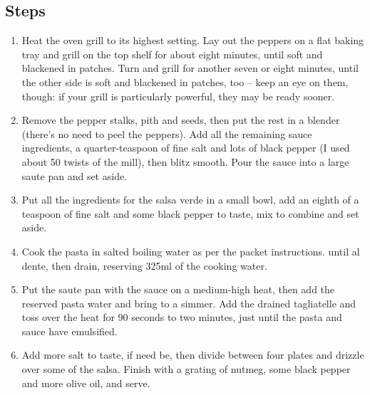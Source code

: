 \documentclass{book}
\begin{document}
\subsection*{Steps}
\begin{enumerate}
\item Heat the oven grill to its highest setting. Lay out the peppers on a flat baking tray and grill on the top shelf for about eight minutes, until soft and blackened in patches. Turn and grill for another seven or eight minutes, until the other side is soft and blackened in patches, too – keep an eye on them, though: if your grill is particularly powerful, they may be ready sooner.
\item Remove the pepper stalks, pith and seeds, then put the rest in a blender (there’s no need to peel the peppers). Add all the remaining sauce ingredients, a quarter-teaspoon of fine salt and lots of black pepper (I used about 50 twists of the mill), then blitz smooth. Pour the sauce into a large saute pan and set aside.
\item Put all the ingredients for the salsa verde in a small bowl, add an eighth of a teaspoon of fine salt and some black pepper to taste, mix to combine and set aside.
\item Cook the pasta in salted boiling water as per the packet instructions. until al dente, then drain, reserving 325ml of the cooking water.
\item Put the saute pan with the sauce on a medium-high heat, then add the reserved pasta water and bring to a simmer. Add the drained tagliatelle and toss over the heat for 90 seconds to two minutes, just until the pasta and sauce have emulsified.
\item Add more salt to taste, if need be, then divide between four plates and drizzle over some of the salsa. Finish with a grating of nutmeg, some black pepper and more olive oil, and serve.
\end{enumerate}
\newpage
\end{document}
